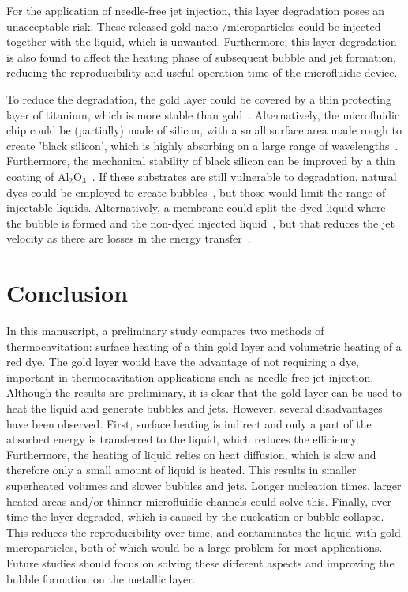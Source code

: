 \documentclass[11pt]{article}
\begin{document}
For the application of needle-free jet injection, this layer degradation poses an unacceptable risk. These released gold nano-/microparticles could be injected together with the liquid, which is unwanted. Furthermore, this layer degradation is also found to affect the heating phase of subsequent bubble and jet formation, reducing the reproducibility and useful operation time of the microfluidic device.

To reduce the degradation, the gold layer could be covered by a thin protecting layer of titanium, which is more stable than gold~\cite{Shlepakov2020,FernandezRivas2012}. Alternatively, the microfluidic chip could be (partially) made of silicon, with a small surface area made rough to create 'black silicon', which is highly absorbing on a large range of wavelengths~\cite{Fan2021}. Furthermore, the mechanical stability of black silicon can be improved by a thin coating of Al$_{2}$O$_{3}$~\cite{Schmelz2023}. If these substrates are still vulnerable to degradation, natural dyes could be employed to create bubbles~\cite{Afanador-Delgado2020}, but those would limit the range of injectable liquids. Alternatively, a membrane could split the dyed-liquid where the bubble is formed and the non-dyed injected liquid~\cite{Han2010}, but that reduces the jet velocity as there are losses in the energy transfer~\cite{EbrahimiOrimi2020}.



\section{Conclusion}
In this manuscript, a preliminary study compares two methods of thermocavitation: surface heating of a thin gold layer and volumetric heating of a red dye. The gold layer would have the advantage of not requiring a dye, important in thermocavitation applications such as needle-free jet injection. Although the results are preliminary, it is clear that the gold layer can be used to heat the liquid and generate bubbles and jets. However, several disadvantages have been observed. First, surface heating is indirect and only a part of the absorbed energy is transferred to the liquid, which reduces the efficiency. Furthermore, the heating of liquid relies on heat diffusion, which is slow and therefore only a small amount of liquid is heated. This results in smaller superheated volumes and slower bubbles and jets. Longer nucleation times, larger heated areas and/or thinner microfluidic channels could solve this. Finally, over time the layer degraded, which is caused by the nucleation or bubble collapse. This reduces the reproducibility over time, and contaminates the liquid with gold microparticles, both of which would be a large problem for most applications. Future studies should focus on solving these different aspects and improving the bubble formation on the metallic layer.
\end{document}
